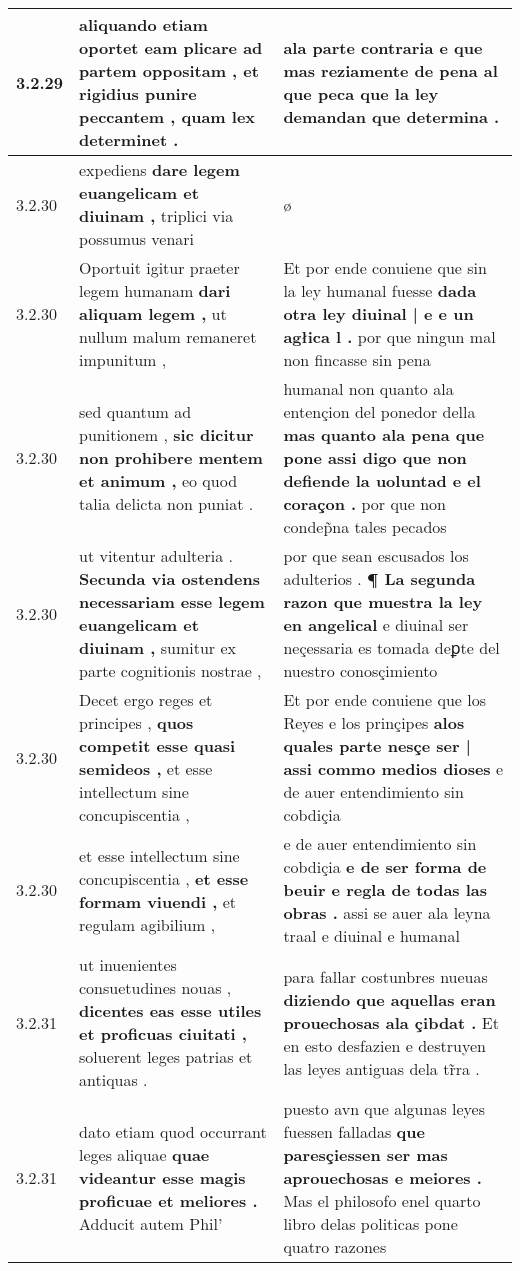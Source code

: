 \begin{tabular}{|p{1cm}|p{6.5cm}|p{6.5cm}|}
3.2.29 & aliquando etiam oportet eam plicare ad partem oppositam , \textbf{ et rigidius punire peccantem , } quam lex determinet . & ala parte contraria \textbf{ e que mas reziamente de pena } al que peca que la ley demandan que determina . \\\hline
3.2.30 & expediens \textbf{ dare legem euangelicam et diuinam , } triplici via possumus venari & ø \\\hline
3.2.30 & Oportuit igitur praeter legem humanam \textbf{ dari aliquam legem , } ut nullum malum remaneret impunitum , & Et por ende conuiene que sin la ley humanal fuesse \textbf{ dada otra ley diuinal | e e un agłica l . } por que ningun mal non fincasse sin pena \\\hline
3.2.30 & sed quantum ad punitionem , \textbf{ sic dicitur non prohibere mentem et animum , } eo quod talia delicta non puniat . & humanal non quanto ala entençion del ponedor della \textbf{ mas quanto ala pena que pone assi digo que non defiende la uoluntad e el coraçon . } por que non condep̃na tales pecados \\\hline
3.2.30 & ut vitentur adulteria . \textbf{ Secunda via ostendens necessariam esse legem euangelicam et diuinam , } sumitur ex parte cognitionis nostrae , & por que sean escusados los adulterios . \textbf{ ¶ La segunda razon que muestra la ley en angelical } e diuinal ser neçessaria es tomada deꝑte del nuestro conosçimiento \\\hline
3.2.30 & Decet ergo reges et principes , \textbf{ quos competit esse quasi semideos , } et esse intellectum sine concupiscentia , & Et por ende conuiene que los Reyes e los prinçipes \textbf{ alos quales parte nesçe ser | assi commo medios dioses } e de auer entendimiento sin cobdiçia \\\hline
3.2.30 & et esse intellectum sine concupiscentia , \textbf{ et esse formam viuendi , } et regulam agibilium , & e de auer entendimiento sin cobdiçia \textbf{ e de ser forma de beuir e regla de todas las obras . } assi se auer ala leyna traal e diuinal e humanal \\\hline
3.2.31 & ut inuenientes consuetudines nouas , \textbf{ dicentes eas esse utiles et proficuas ciuitati , } soluerent leges patrias et antiquas . & para fallar costunbres nueuas \textbf{ diziendo que aquellas eran prouechosas ala çibdat . } Et en esto desfazien e destruyen las leyes antiguas dela tr̃ra . \\\hline
3.2.31 & dato etiam quod occurrant leges aliquae \textbf{ quae videantur esse magis proficuae et meliores . } Adducit autem Phil’ & puesto avn que algunas leyes fuessen falladas \textbf{ que paresçiessen ser mas aprouechosas e meiores . } Mas el philosofo enel quarto libro delas politicas pone quatro razones \\\hline

\end{tabular}
